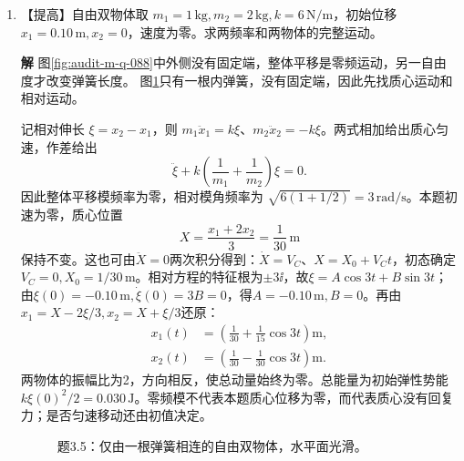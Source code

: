 \documentclass[11pt,openany,fontset=fandol]{ctexbook}
\theoremstyle{plain}\newtheorem{theorem}{定理}[chapter]\newtheorem{proposition}[theorem]{命题}
\theoremstyle{definition}\newtheorem{definition}{定义}[chapter]\newtheorem{example}{例}[chapter]
\theoremstyle{remark}\newtheorem*{remark}{说明}
\newcommand{\SolutionStart}{\par\nobreak\medskip\nobreak\noindent\textbf{解}\quad\ignorespaces}
\newenvironment{solution}{\SolutionStart}{\par\medskip}
\begin{document}
\begin{enumerate}[label=3.\arabic*]
\begin{solution}
初态在图中只有第一根与中间弹簧形变，因而总能量包含两项 $ka^2/2$；完整位移的形状还可与图\ref{fig:eg-3-7}比较。
\end{solution}

\item \begin{minipage}[t]{\linewidth}
【提高】自由双物体取 $m_1=1\,\mathrm{kg},m_2=2\,\mathrm{kg},k=6\,\mathrm{N/m}$，初始位移 $x_1=0.10\,\mathrm m,x_2=0$，速度为零。求两频率和两物体的完整运动。

\end{minipage}

\begin{solution}
图\ref{fig:audit-m-q-088}中外侧没有固定端，整体平移是零频运动，另一自由度才改变弹簧长度。
图\ref{fig:ex-3-5}只有一根内弹簧，没有固定端，因此先找质心运动和相对运动。

记相对伸长 $\xi=x_2-x_1$，则 $m_1\ddot x_1=k\xi$、$m_2\ddot x_2=-k\xi$。两式相加给出质心匀速，作差给出
\[
\ddot\xi+k\left(\frac1{m_1}+\frac1{m_2}\right)\xi=0.
\]
因此整体平移模频率为零，相对模角频率为 $\sqrt{6(1+1/2)}=3\,\mathrm{rad/s}$。本题初速为零，质心位置
\[
X=\frac{x_1+2x_2}{3}=\frac1{30}\,\mathrm m
\]
保持不变。这也可由$\ddot X=0$两次积分得到：$\dot X=V_C$、$X=X_0+V_Ct$，初态确定$V_C=0,X_0=1/30\,\mathrm m$。相对方程的特征根为$\pm3\ii$，故$\xi=A\cos3t+B\sin3t$；由$\xi(0)=-0.10\,\mathrm m,\dot\xi(0)=3B=0$，得$A=-0.10\,\mathrm m,B=0$。再由$x_1=X-2\xi/3,x_2=X+\xi/3$还原：
\begin{align*}
x_1(t)&=\left(\frac1{30}+\frac1{15}\cos3t\right)\mathrm m,\\
x_2(t)&=\left(\frac1{30}-\frac1{30}\cos3t\right)\mathrm m.
\end{align*}
两物体的振幅比为2，方向相反，使总动量始终为零。总能量为初始弹性势能 $k\xi(0)^2/2=0.030\,\mathrm J$。零频模不代表本题质心位移为零，而代表质心没有回复力；是否匀速移动还由初值决定。

\begin{figure}[H]\centering
{}
\caption{题3.5：仅由一根弹簧相连的自由双物体，水平面光滑。}\label{fig:ex-3-5}
\end{figure}


\end{solution}
\end{enumerate}
\end{document}
